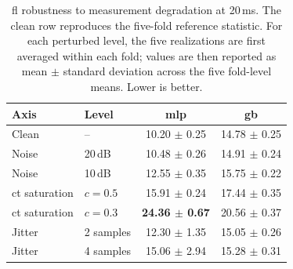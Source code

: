 \begin{table}[pos=ht]
\caption{\ac{fl} robustness to measurement degradation at 20\,ms. The clean row reproduces the five-fold reference statistic. For each perturbed level, the five realizations are first averaged within each fold; values are then reported as mean $\pm$ standard deviation across the five fold-level means. Lower is better.}
\label{tab:fidelity_fl}
\small
\centering
\begin{revblock}
\begin{tabular}{llcc}
\toprule
\textbf{Axis} & \textbf{Level} & \textbf{\ac{mlp}} & \textbf{\ac{gb}} \\
\midrule
Clean                 & --        & 10.20 $\pm$ 0.25 & 14.78 $\pm$ 0.25 \\
Noise                 & 20\,dB    & 10.48 $\pm$ 0.26 & 14.91 $\pm$ 0.24 \\
Noise                 & 10\,dB    & 12.55 $\pm$ 0.35 & 15.75 $\pm$ 0.22 \\
\ac{ct} saturation    & $c=0.5$   & 15.91 $\pm$ 0.24 & 17.44 $\pm$ 0.35 \\
\ac{ct} saturation    & $c=0.3$   & \textbf{24.36 $\pm$ 0.67} & 20.56 $\pm$ 0.37 \\
Jitter                & 2 samples & 12.30 $\pm$ 1.35 & 15.05 $\pm$ 0.26 \\
Jitter                & 4 samples & 15.06 $\pm$ 2.94 & 15.28 $\pm$ 0.31 \\
\bottomrule
\end{tabular}
\end{revblock}
\end{table}
